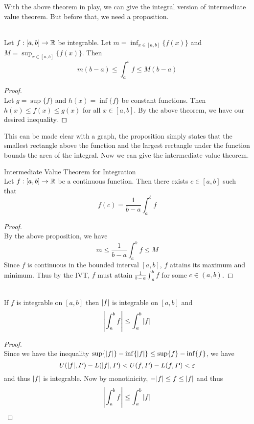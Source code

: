 \documentclass[a4paper]{article}
\begin{document}
With the above theorem in play, we can give the integral version of intermediate value theorem. But before that, we need a proposition. 

\begin{prp}{}{}\\ Let $f:[a,b]\to\mathbb{R}$ be integrable. Let $m=\inf_{x\in[a,b]}\{f(x)\}$ and $M=\sup_{x\in[a,b]}\{f(x)\}$. Then $$m(b-a)\leq\int_{a}^{b}f\leq M(b-a)$$ 
\begin{proof}\\ Let $g=\sup\{f\}$ and $h(x)=\inf\{f\}$ be constant functions. Then $h(x)\leq f(x)\leq g(x)$ for all $x\in[a,b]$. By the above theorem, we have our desired inequality. 
\end{proof}
\end{prp}

This can be made clear with a graph, the proposition simply states that the smallest rectangle above the function and the largest rectangle under the function bounds the area of the integral. Now we can give the intermediate value theorem. 

\begin{thm}{Intermediate Value Theorem for Integration}{}\\ Let $f:[a,b]\to\mathbb{R}$ be a continuous function. Then there exists $c\in[a,b]$ such that $$f(c)=\frac{1}{b-a}\int_{a}^{b}f$$ 
\begin{proof}\\ By the above proposition, we have $$m\leq\frac{1}{b-a}\int_a^bf\leq M$$ Since $f$ is continuous in the bounded interval $[a,b]$, $f$ attains its maximum and minimum. Thus by the IVT, $f$ must attain $\frac{1}{b-a}\int_a^bf$ for some $c\in(a,b)$. 
\end{proof}
\end{thm}

\begin{thm}{}{}\\ If $f$ is integrable on $[a,b]$ then $\abs{f}$ is integrable on $[a,b]$ and $$\abs{\int_{a}^{b}f}\leq\int_{a}^{b}\abs{f}$$ \begin{proof}\\ Since we have the inequality $\sup\{\abs{f}\}-\inf\{\abs{f}\}\leq\sup\{f\}-\inf\{f\}$, we have $$U(\abs{f},P)-L(\abs{f},P)<U(f,P)-L(f,P)<\varepsilon$$ and thus $\abs{f}$ is integrable. Now by monotinicity, $-\abs{f}\leq f\leq\abs{f}$ and thus $$\abs{\int_a^bf}\leq\int_a^b\abs{f}$$
\end{proof}
\end{thm}
\end{document}
